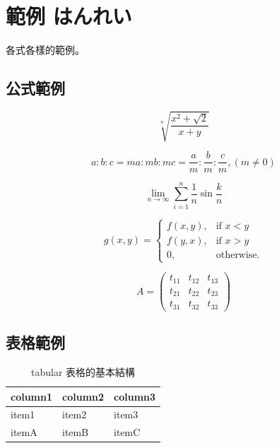 \chapter{範例 はんれい}\label{structure}

各式各樣的範例。

\section{公式範例}
\begin{equation}
   \sqrt[n]{\frac{x^2+\sqrt 2}{x+y}}
\end{equation}

\begin{equation}
   a:b:c = ma : mb: mc = \frac{a}{m} : \frac{b}{m} : \frac{c}{m} , (m \neq 0)
\end{equation}

\begin{equation}
\lim_{n \to \infty}\sum_{i=1}^n{\frac{1}{n}}\sin\frac{k}{n}
\end{equation}

\begin{equation}
   g(x,y) = \left\{\begin{array}{ll}
      f(x,y), & \mbox{if $x<y$} \\  %
      f(y,x), & \mbox{if $x>y$} \\  %
      0,      & \mbox{otherwise.}
     \end{array} \right.
\end{equation}

\begin{equation}
   A =\begin{pmatrix}                %
  t_{11} & t_{12} & t_{13} \\
  t_{21} & t_{22} & t_{23} \\
  t_{31} & t_{32} & t_{33}
   \end{pmatrix}
\end{equation}
\vspace*{3em}
\clearpage

\section{表格範例}
\begin{table}[h]
   \centering
   \caption{tabular 表格的基本結構}\label{booktabs_1}
		\begin{tabular}[t]{lll}
		\hline
		column1 & column2 & column3 \\
		\hline
		item1   & item2   & item3 \\
		itemA   & itemB   & itemC \\
		\hline
		\end{tabular}
\end{table}

